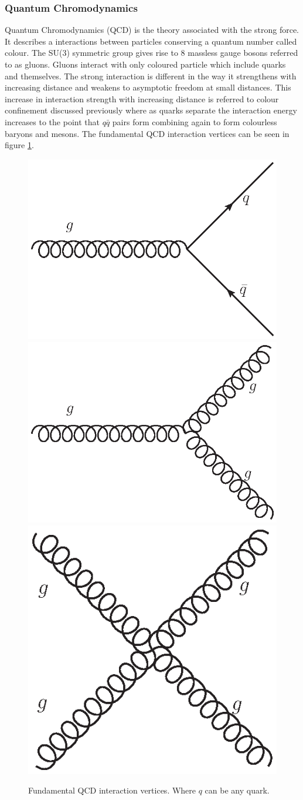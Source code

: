     \subsubsection*{Quantum Chromodynamics}
    
    Quantum Chromodynamics (QCD) is the theory associated with the strong force. It describes a interactions between particles conserving a quantum number called colour. The SU(3) symmetric group gives rise to 8 massless gauge bosons referred to as gluons. Gluons interact with only coloured particle which include quarks and themselves. The strong interaction is different in the way it strengthens with increasing distance and weakens to asymptotic freedom at small distances. This increase in interaction strength with increasing distance is referred to colour confinement discussed previously where as quarks separate the interaction energy increases to the point that $q\bar{q}$ pairs form combining again to form colourless baryons and mesons. The fundamental QCD interaction vertices can be seen in figure \ref{fig:QCD}.

    \begin{figure}[h]
        \begin{center}
        \includegraphics[width=0.34\linewidth]{images/g_quark.eps}
        \includegraphics[width=0.34\linewidth]{images/g_gg.eps}
        \includegraphics[width=0.25\linewidth]{images/gg_gg.eps}
        \end{center}
        \caption{Fundamental QCD interaction vertices. Where $q$ can be any quark.}
        \label{fig:QCD}
    \end{figure}


